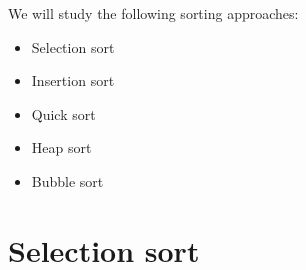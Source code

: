 \documentclass{beamer}[10pt, usepdftitle=false, handout]
\begin{document}
	\begin{frame}

	We will study the following sorting approaches:
	
	\vspace*{1em}	
	
	\begin{itemize}
	\item{Selection sort}
	\item {Insertion sort}
	\item {Quick sort}
	\item {Heap sort}
	\item {Bubble sort}
	\end{itemize}
	
	\end{frame}

	\section {Selection sort}
	
\end{document}
